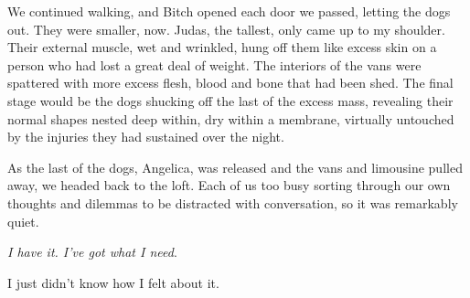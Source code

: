 We continued walking, and Bitch opened each door we passed, letting the dogs out.  They were smaller, now.  Judas, the tallest, only came up to my shoulder.  Their external muscle, wet and wrinkled, hung off them like excess skin on a person who had lost a great deal of weight.  The interiors of the vans were spattered with more excess flesh, blood and bone that had been shed.  The final stage would be the dogs shucking off the last of the excess mass, revealing their normal shapes nested deep within, dry within a membrane, virtually untouched by the injuries they had sustained over the night.



As the last of the dogs, Angelica, was released and the vans and limousine pulled away, we headed back to the loft.  Each of us too busy sorting through our own thoughts and dilemmas to be distracted with conversation, so it was remarkably quiet.



\emph{I have it.  I've got what I need}.



I just didn't know how I felt about it.






